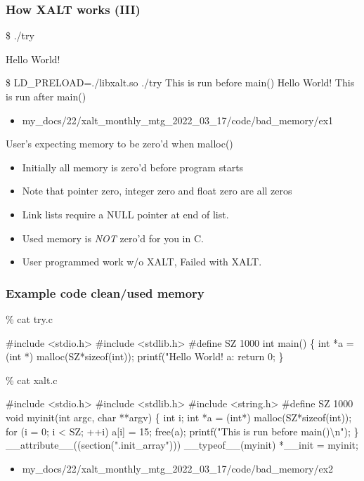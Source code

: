 \documentclass{beamer}
\begin{document}
\begin{frame}[fragile]
    \frametitle{How XALT works (III)}
 {\small
    \begin{semiverbatim}
\$ ./try

Hello World!

\$ LD\_PRELOAD=./libxalt.so  ./try
This is run before main()
Hello World!
This is run after main()
    \end{semiverbatim}
}
  \begin{itemize}
    \item my\_docs/22/xalt\_monthly\_mtg\_2022\_03\_17/code/bad\_memory/ex1
  \end{itemize}

\end{frame}

\begin{frame}{User's expecting memory to be zero'd when malloc() }
  \begin{itemize}
    \item Initially all memory is zero'd before program starts
    \item Note that pointer zero, integer zero and float zero are all zeros
    \item Link lists require a NULL pointer at end of list.
    \item Used memory is {\color{red} \emph{NOT}} zero'd for you in C.
    \item User programmed work w/o XALT, Failed with XALT.
  \end{itemize}
\end{frame}

\begin{frame}[fragile]
    \frametitle{Example code clean/used memory}
 {\tiny
    \begin{semiverbatim}
\% cat try.c

#include <stdio.h>
#include <stdlib.h>
#define SZ 1000
int main()
\{
  int *a = (int *) malloc(SZ*sizeof(int));
  printf("Hello World! a:%
  return 0;
\}

\% cat xalt.c

#include <stdio.h>
#include <stdlib.h>
#include <string.h>
#define SZ 1000
void myinit(int argc, char **argv)
\{
  int i;
  int *a = (int*) malloc(SZ*sizeof(int));
  for (i = 0; i < SZ; ++i) a[i] = 15; 
  free(a);
  printf("This is run before main()\textbackslash{}n");
\}
__attribute__((section(".init_array"))) __typeof__(myinit) *__init = myinit;
    \end{semiverbatim}
}

  \begin{itemize}
    \item my\_docs/22/xalt\_monthly\_mtg\_2022\_03\_17/code/bad\_memory/ex2
  \end{itemize}
\end{frame}
\end{document}
